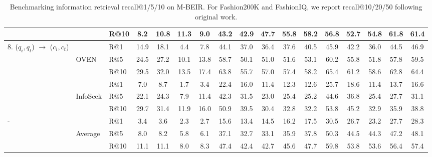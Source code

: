 \begin{table}
{\begin{tabular}{lllcccc|ccccc|ccccc}
         &                     &  R@10& 8.2 & 10.8 & 11.3 & 9.0 & 43.2 & 42.9 & 47.7 &55.8 & 58.2 &56.8 & 52.7 &54.8&61.8 &61.4\\
         \midrule
         \multirow{6}{*}{8. ($q_i, q_t$) $\to$ ($c_i, c_t$)}
         &                        & R@1& 14.9 & 18.1 & 4.4 & 7.8 & 44.1 & 37.0 & 36.4 &37.6 & 40.5 &45.9 & 42.2 &36.0&44.5 &46.9\\
         & OVEN                       & R@5& 24.5 & 27.2 & 10.1 & 13.8 & 58.7 & 50.1 & 51.0 &51.6 & 53.1 &60.2 & 55.8 &51.8&57.8 &59.5\\
         &                        & R@10& 29.5 & 32.0 & 13.5 & 17.4 & 63.8 & 55.7 & 57.0 &57.4 & 58.2 &65.4 & 61.2 &58.6&62.8 &64.4\\
         \cmidrule(lr){2-17}
         &                & R@1& 7.0 & 8.7 & 1.7 & 3.4 & 22.4 & 16.0 & 11.4 &12.3 & 12.6 &25.7 & 18.6 &11.4&13.7 &16.6\\
         & InfoSeek               & R@5& 22.1 & 24.3 & 7.9 & 11.4 & 42.3 & 31.5 & 23.0 &25.4 & 25.2 &44.6 & 36.8 &25.4&27.7 &31.1\\
         &                & R@10& 29.7 & 31.4 & 11.9 & 16.0 & 50.9 & 39.5 & 30.4 &32.8 & 32.2 &53.8 & 45.2 &32.9&35.9 &38.8\\
         \midrule
         \multirow{3}{*}{-}
         &      & R@1 & 3.4 & 3.6 & 2.3 & 2.7 & 15.6 & 13.4 & 14.5 &16.2 & 17.5 &30.5 & 26.7 &23.2&27.7 &28.3\\
         & Average     & R@5 & 8.0 & 8.2 & 5.8 & 6.1 & 37.1 & 32.7 & 33.1 &35.9 & 37.8 &50.3 & 44.5 &44.3&47.2 &48.1\\
         &      & R@10 & 11.1 & 11.1 & 8.0 & 8.3 & 47.4 & 42.4 & 42.7 &45.6 & 47.7 &59.8 & 53.8 &53.6&56.4 &57.4\\

         \bottomrule
    \end{tabular}
    }
    \caption{Benchmarking information retrieval recall@1/5/10 on M-BEIR. For Fashion200K and FashionIQ, we report recall@10/20/50 following original work.}
    \label{tab:union}
\end{table}